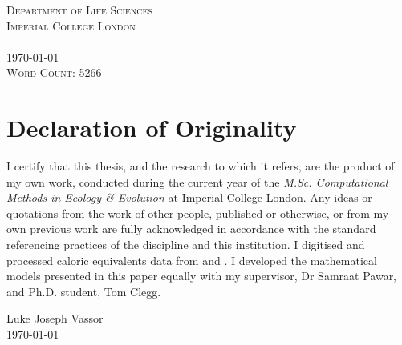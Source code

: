 \documentclass[a4paper]{article} %
\begin{document}
\begin{titlepage}
    \textsc{Department of Life Sciences \\ Imperial College London \\ \ }\\[1cm]
    \textsc{\today}\\ %
    \textsc{Word Count: 5266}
    
    \vfill %
    
\end{titlepage}

\section*{Declaration of Originality}\thispagestyle{plain}
    I certify that this thesis, and the research to which it refers, are the product of my own work, conducted during the current year of the \emph{M.Sc. Computational Methods in Ecology \& Evolution} at Imperial College London. Any ideas or quotations from the work of other people, published or otherwise, or from my own previous work are fully acknowledged in accordance with the standard referencing practices of the discipline and this institution. I digitised and processed caloric equivalents data from \textcite{Cummins1971} and \textcite{Steimle1980}. I developed the mathematical models presented in this paper equally with my supervisor, Dr Samraat Pawar, and Ph.D. student, Tom Clegg.

    \vspace{3cm}
    \begin{flushright}
        Luke Joseph Vassor \\
        \today
    \end{flushright}

\end{document}
